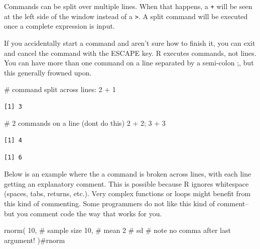 \documentclass[
  13,
  letterpaper,
]{report}
\newenvironment{Shaded}{\begin{snugshade}}{\end{snugshade}}
\newcommand{\CommentTok}[1]{\textcolor[rgb]{0.37,0.37,0.37}{#1}}
\newcommand{\DecValTok}[1]{\textcolor[rgb]{0.68,0.00,0.00}{#1}}
\newcommand{\FunctionTok}[1]{\textcolor[rgb]{0.28,0.35,0.67}{#1}}
\newcommand{\NormalTok}[1]{\textcolor[rgb]{0.00,0.23,0.31}{#1}}
\newcommand{\SpecialCharTok}[1]{\textcolor[rgb]{0.37,0.37,0.37}{#1}}
\begin{document}
Commands can be split over multiple lines. When that happens, a
\texttt{+} will be seen at the left side of the window instead of a
\texttt{\textgreater{}}. A split command will be executed once a
complete expression is input.

If you accidentally start a command and aren't sure how to finish it,
you can exit and cancel the command with the ESCAPE key. R executes
commands, not lines. You can have more than one command on a line
separated by a semi-colon ;, but this generally frowned upon.

\begin{Shaded}
\begin{Highlighting}[]
\CommentTok{\# command split across lines:}
\DecValTok{2} \SpecialCharTok{+} 
\DecValTok{1}
\end{Highlighting}
\end{Shaded}

\begin{verbatim}
[1] 3
\end{verbatim}

\begin{Shaded}
\begin{Highlighting}[]
\CommentTok{\# 2 commands on a line (don\textquotesingle{}t do this)}
\DecValTok{2} \SpecialCharTok{+} \DecValTok{2}\NormalTok{; }\DecValTok{3} \SpecialCharTok{+} \DecValTok{3}
\end{Highlighting}
\end{Shaded}

\begin{verbatim}
[1] 4
\end{verbatim}

\begin{verbatim}
[1] 6
\end{verbatim}

Below is an example where the a command is broken across lines, with
each line getting an explanatory comment. This is possible because R
ignores whitespace (spaces, tabs, returns, etc.). Very complex functions
or loops might benefit from this kind of commenting. Some programmers do
not like this kind of comment--but you comment code the way that works
for you.

\begin{Shaded}
\begin{Highlighting}[]
\FunctionTok{rnorm}\NormalTok{(}
  \DecValTok{10}\NormalTok{,  }\CommentTok{\# sample size}
  \DecValTok{10}\NormalTok{,  }\CommentTok{\# mean}
  \DecValTok{2}    \CommentTok{\# sd}
       \CommentTok{\# note no comma after last argument!}
\NormalTok{)}\CommentTok{\#rnorm}
\end{Highlighting}
\end{Shaded}
\end{document}
